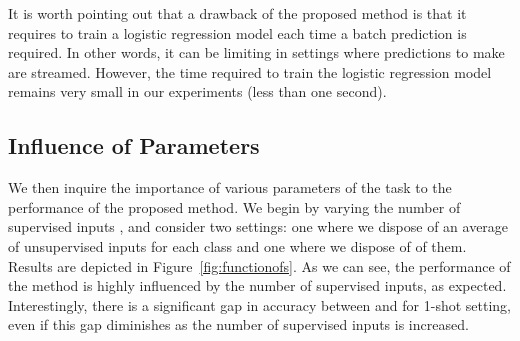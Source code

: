 \documentclass[a4paper,conference]{IEEEtran}
\begin{document}
It is worth pointing out that a drawback of the proposed method is that it requires to train a logistic regression model each time a batch prediction is required. In other words, it can be limiting in settings where predictions to make are streamed. However, the time required to train the logistic regression model remains very small in our experiments (less than one second).

\begin{table}
    \caption{1-shot and 5-shot accuracy on miniImageNet, when using the WRN backbone and various Graph Neural Networks. We use the same hyperparameters as Table~\ref{tab:results} and apply them to all methods (with the exception of  for GCN and GAT).}
    \centering

    \label{tab:results_compare}
\end{table}

\subsection{Influence of Parameters}

We then inquire the importance of various parameters of the task to the performance of the proposed method. We begin by varying the number of supervised inputs , and consider two settings: one where we dispose of an average of  unsupervised inputs for each class and one where we dispose of  of them. Results are depicted in Figure~\ref{fig:functionofs}. As we can see, the performance of the method is highly influenced by the number of supervised inputs, as expected. Interestingly, there is a significant gap in accuracy between  and  for 1-shot setting, even if this gap diminishes as the number of supervised inputs is increased.
\end{document}
